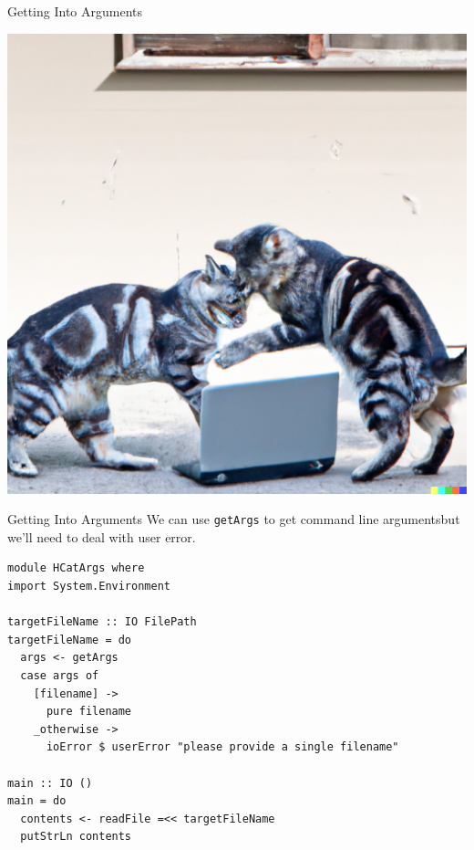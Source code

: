 \documentclass[10pt, presentation, colorlinks]{beamer}
\begin{document}
\begin{frame}[label={sec:orgd91e754}]{Getting Into Arguments}
\begin{center}
\includegraphics[height=0.6\textheight]{./img/arguments.png}
\end{center}
\end{frame}

\begin{frame}[label={sec:org85ad5ed},fragile]{Getting Into Arguments}
 We can use \alert{\texttt{getArgs}} to get command line argumentsbut we'll need to
deal with user error.

\bigskip
\pause

\begin{verbatim}
module HCatArgs where
import System.Environment

targetFileName :: IO FilePath
targetFileName = do
  args <- getArgs
  case args of
    [filename] ->
      pure filename
    _otherwise ->
      ioError $ userError "please provide a single filename"

main :: IO ()
main = do
  contents <- readFile =<< targetFileName
  putStrLn contents
\end{verbatim}
\end{frame}
\end{document}
